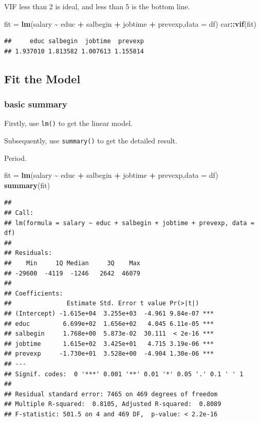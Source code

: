 \documentclass[
]{ctexart}
\newenvironment{Shaded}{\begin{snugshade}}{\end{snugshade}}
\newcommand{\AttributeTok}[1]{\textcolor[rgb]{0.13,0.29,0.53}{#1}}
\newcommand{\FunctionTok}[1]{\textcolor[rgb]{0.13,0.29,0.53}{\textbf{#1}}}
\newcommand{\NormalTok}[1]{#1}
\newcommand{\OtherTok}[1]{\textcolor[rgb]{0.56,0.35,0.01}{#1}}
\newcommand{\SpecialCharTok}[1]{\textcolor[rgb]{0.81,0.36,0.00}{\textbf{#1}}}
\begin{document}
VIF less than 2 is ideal, and less than 5 is the bottom line.

\begin{Shaded}
\begin{Highlighting}[]
\NormalTok{fit }\OtherTok{=} \FunctionTok{lm}\NormalTok{(salary }\SpecialCharTok{\textasciitilde{}}\NormalTok{ educ }\SpecialCharTok{+}\NormalTok{ salbegin }\SpecialCharTok{+}\NormalTok{ jobtime }\SpecialCharTok{+}\NormalTok{ prevexp,}\AttributeTok{data =}\NormalTok{ df)}
\NormalTok{car}\SpecialCharTok{::}\FunctionTok{vif}\NormalTok{(fit)}
\end{Highlighting}
\end{Shaded}

\begin{verbatim}
##     educ salbegin  jobtime  prevexp 
## 1.937010 1.813582 1.007613 1.155814
\end{verbatim}

\hypertarget{fit-the-model-3}{%
\subsection{Fit the Model}\label{fit-the-model-3}}

\hypertarget{basic-summary}{%
\subsubsection{basic summary}\label{basic-summary}}

Firstly, use \texttt{lm()} to get the linear model.

Subsequently, use \texttt{summary()} to get the detailed result.

Period.

\begin{Shaded}
\begin{Highlighting}[]
\NormalTok{fit }\OtherTok{=} \FunctionTok{lm}\NormalTok{(salary }\SpecialCharTok{\textasciitilde{}}\NormalTok{ educ }\SpecialCharTok{+}\NormalTok{ salbegin }\SpecialCharTok{+}\NormalTok{ jobtime }\SpecialCharTok{+}\NormalTok{ prevexp,}\AttributeTok{data =}\NormalTok{ df)}
\FunctionTok{summary}\NormalTok{(fit)}
\end{Highlighting}
\end{Shaded}

\begin{verbatim}
## 
## Call:
## lm(formula = salary ~ educ + salbegin + jobtime + prevexp, data = df)
## 
## Residuals:
##    Min     1Q Median     3Q    Max 
## -29600  -4119  -1246   2642  46079 
## 
## Coefficients:
##               Estimate Std. Error t value Pr(>|t|)    
## (Intercept) -1.615e+04  3.255e+03  -4.961 9.84e-07 ***
## educ         6.699e+02  1.656e+02   4.045 6.11e-05 ***
## salbegin     1.768e+00  5.873e-02  30.111  < 2e-16 ***
## jobtime      1.615e+02  3.425e+01   4.715 3.19e-06 ***
## prevexp     -1.730e+01  3.528e+00  -4.904 1.30e-06 ***
## ---
## Signif. codes:  0 '***' 0.001 '**' 0.01 '*' 0.05 '.' 0.1 ' ' 1
## 
## Residual standard error: 7465 on 469 degrees of freedom
## Multiple R-squared:  0.8105, Adjusted R-squared:  0.8089 
## F-statistic: 501.5 on 4 and 469 DF,  p-value: < 2.2e-16
\end{verbatim}
\end{document}
